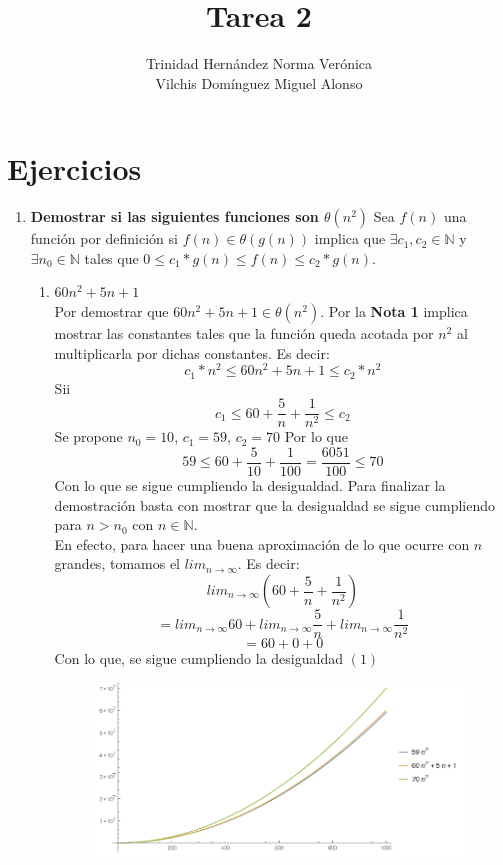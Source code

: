 \documentclass[11 pt, a4paper]{article}
\author{Trinidad Hern\'andez Norma Ver\'onica \\
        Vilchis Dom\'inguez Miguel Alonso}
\title{Tarea 2}
\date{}
\theoremstyle{definition}
\begin{document}
\maketitle

\section{Ejercicios}

\begin{enumerate}
 \item \textbf{Demostrar si las siguientes funciones son $\theta(n^2)$}
 \no Sea $f(n)$ una función por definición si $f(n) \in \theta(g(n))$ 
 implica que $ \exists c_1, c_2 \in \mathbb{N} $ y $\exists n_0 \in \mathbb{N}$ 
 tales que $0 \leq c_1*g(n) \leq f(n) \leq c_2*g(n)$.
 \begin{enumerate}
  \item $60n^2 + 5n +1$\\
  Por demostrar que $60n^2 + 5n +1 \in \theta(n^2)$. Por la \textbf{Nota 1}
  implica mostrar las constantes tales que la función queda acotada por 
  $n^2$ al multiplicarla por dichas constantes. Es decir:\\
  \begin{equation} 
   c_1* n^2 \leq 60n^2 + 5n +1 \leq c_2 * n^2 
   \end{equation}
  Sii
  \[ c_1 \leq 60 + \frac{5}{n} + \frac{1}{n^2} \leq c_2 \]
  Se propone $n_0 = 10$, $c_1 = 59$, $c_2 = 70$  Por lo que
  \[ 59 \leq 60 + \frac{5}{10} + \frac{1}{100} = \frac{6051}{100} \leq 70  \]
  Con lo que se sigue cumpliendo la desigualdad. Para finalizar la demostración 
  basta con mostrar que la desigualdad se sigue cumpliendo para
  $n > n_0$ con $n \in \mathbb{N}$.\\ 
  En efecto, para hacer una buena aproximación de lo que ocurre con 
  $n$ grandes, tomamos el $lim_{n \rightarrow \infty}$. Es decir:
  \[ lim_{n \rightarrow \infty} (60 + \frac{5}{n} + \frac{1}{n^2} )\]
   \[  = lim_{n \rightarrow \infty} 60 + lim_{n \rightarrow \infty} \frac{5}{n} + lim_{n \rightarrow \infty} \frac{1}{n^2} \]
  \[  = 60 + 0+0 \]
  Con lo que, se sigue cumpliendo la desigualdad $(1)$
  \begin{figure}[H]
         \centering
          \includegraphics[trim=0cm 0cm 0cm 0cm, width=15cm]{inciso1.png} 

\end{figure}
\end{enumerate}
\end{enumerate}
\end{document}
